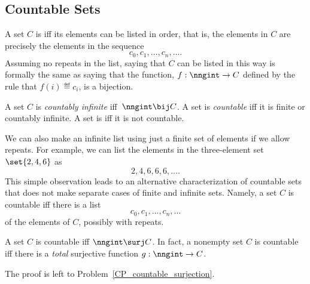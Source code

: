 \subsection{Countable Sets}\label{countable_subsec}
A set $C$ is  iff its elements can be listed in
order, that is, the elements in $C$ are precisely the elements in the
sequence
\[
c_0, c_1, \dots, c_n, \dots.
\]
Assuming no repeats in the list, saying that $C$ can be listed in this
way is formally the same as saying that the function, $f:\nngint \to
C$ defined by the rule that $f(i) \eqdef c_i$, is a bijection.

\begin{definition}\label{def_countable}
A set $C$ is \emph{countably infinite}%
 iff\  $\nngint \bij C$.  A
set is \emph{countable} iff it is finite or countably infinite.
A set is  iff it is not countable.
\end{definition}

We can also make an infinite list using just a finite set of elements
if we allow repeats.  For example, we can list the elements in the
three-element set $\set{2, 4, 6}$ as
\[
2,4,6,6,6,\dots.
\]
This simple observation leads to an alternative characterization of
countable sets that does not make separate cases of finite and
infinite sets.  Namely, a set $C$ is countable iff there is a list
\[
c_0, c_1, \dots, c_n, \dots
\]
of the elements of $C$, possibly with repeats.

\begin{lemma}\label{NsurjC}
A set $C$ is countable iff $\nngint \surj C$.  In fact, a nonempty
set $C$ is countable iff there is a \emph{total} surjective function
$g:\nngint \to C$.
\end{lemma}
The proof is left to Problem~\ref{CP_countable_surjection}.

